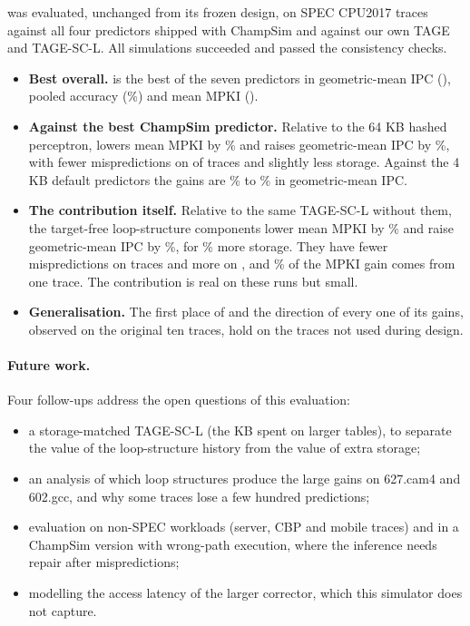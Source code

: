 \prop{} was evaluated, unchanged from its frozen design, on  SPEC CPU2017 traces against all four predictors shipped with ChampSim and against our own TAGE and TAGE-SC-L. All  simulations succeeded and passed the consistency checks.
\begin{itemize}
\item \textbf{Best overall.} \prop{} is the best of the seven predictors in geometric-mean IPC (), pooled accuracy (\%) and mean MPKI ().
\item \textbf{Against the best ChampSim predictor.} Relative to the 64 KB hashed perceptron, \prop{} lowers mean MPKI by \% and raises geometric-mean IPC by \%, with fewer mispredictions on  of  traces and slightly less storage. Against the 4 KB default predictors the gains are \% to \% in geometric-mean IPC.
\item \textbf{The contribution itself.} Relative to the same TAGE-SC-L without them, the target-free loop-structure components lower mean MPKI by \% and raise geometric-mean IPC by \%, for \% more storage. They have fewer mispredictions on  traces and more on , and \% of the MPKI gain comes from one trace. The contribution is real on these runs but small.
\item \textbf{Generalisation.} The first place of \prop{} and the direction of every one of its gains, observed on the original ten traces, hold on the  traces not used during design.
\end{itemize}

\paragraph{Future work.} Four follow-ups address the open questions of this evaluation:
\begin{itemize}
\item a storage-matched TAGE-SC-L (the  KB spent on larger tables), to separate the value of the loop-structure history from the value of extra storage;
\item an analysis of which loop structures produce the large gains on 627.cam4 and 602.gcc, and why some traces lose a few hundred predictions;
\item evaluation on non-SPEC workloads (server, CBP and mobile traces) and in a ChampSim version with wrong-path execution, where the inference needs repair after mispredictions;
\item modelling the access latency of the larger corrector, which this simulator does not capture.
\end{itemize}
